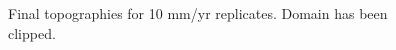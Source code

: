 \documentclass[a4paper]{article}
\begin{document}
\begin{appendices}
\begin{figure}[!ht]
	\caption{Final topographies for 10 mm/yr replicates. Domain has been clipped.}
	\label{fig:010topo}
\end{figure}


\end{appendices}
\end{document}
